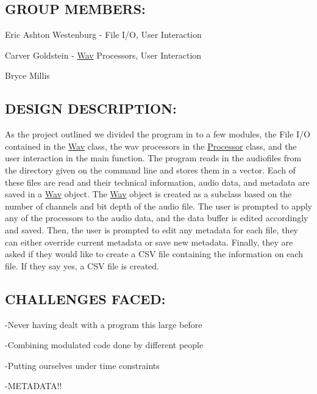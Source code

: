 \subsection*{G\+R\+O\+UP M\+E\+M\+B\+E\+RS\+:}

Eric Ashton Westenburg -\/ File I/O, User Interaction

Carver Goldstein -\/ \hyperlink{classWav}{Wav} Processors, User Interaction

Bryce Millis

\subsection*{D\+E\+S\+I\+GN D\+E\+S\+C\+R\+I\+P\+T\+I\+ON\+:}

As the project outlined we divided the program in to a few modules, the File I/O contained in the \hyperlink{classWav}{Wav} class, the wav processors in the \hyperlink{classProcessor}{Processor} class, and the user interaction in the main function. The program reads in the audiofiles from the directory given on the command line and stores them in a vector. Each of these files are read and their technical information, audio data, and metadata are saved in a \hyperlink{classWav}{Wav} object. The \hyperlink{classWav}{Wav} object is created as a subclass based on the number of channels and bit depth of the audio file. The user is prompted to apply any of the processors to the audio data, and the data buffer is edited accordingly and saved. Then, the user is prompted to edit any metadata for each file, they can either override current metadata or save new metadata. Finally, they are asked if they would like to create a C\+SV file containing the information on each file. If they say yes, a C\+SV file is created.



\subsection*{C\+H\+A\+L\+L\+E\+N\+G\+ES F\+A\+C\+ED\+:}

-\/\+Never having dealt with a program this large before

-\/\+Combining modulated code done by different people

-\/\+Putting ourselves under time constraints

-\/\+M\+E\+T\+A\+D\+A\+T\+A!! 